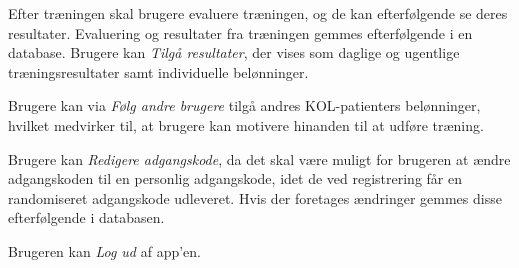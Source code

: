 Efter træningen skal brugere evaluere træningen, og de kan efterfølgende se deres resultater. Evaluering og resultater fra træningen gemmes efterfølgende i en database. Brugere kan \textit{Tilgå resultater}, der vises som daglige og ugentlige træningsresultater samt individuelle belønninger. 

Brugere kan via \textit{Følg andre brugere} tilgå andres KOL-patienters belønninger, hvilket medvirker til, at brugere kan motivere hinanden til at udføre træning. 

Brugere kan \textit{Redigere adgangskode}, da det skal være muligt for brugeren at ændre adgangskoden til en personlig adgangskode, idet de ved registrering får en randomiseret adgangskode udleveret. Hvis der foretages ændringer gemmes disse efterfølgende i databasen.

Brugeren kan \textit{Log ud} af app'en. 



%
%
%
%
